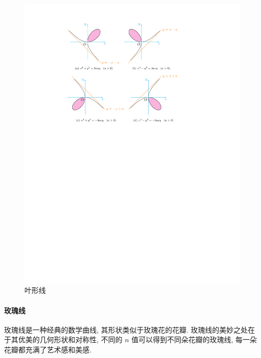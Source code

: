 \begin{figure}[H]
    \centering
    \includegraphics{figures/LeafLinear.pdf}
    \caption{叶形线}
    \label{leafLinear}
\end{figure}

\paragraph{玫瑰线}

玫瑰线是一种经典的数学曲线, 其形状类似于玫瑰花的花瓣. 玫瑰线的美妙之处在于其优美的几何形状和对称性, 不同的 $n$ 值可以得到不同朵花瓣的玫瑰线, 每一朵花瓣都充满了艺术感和美感. 

